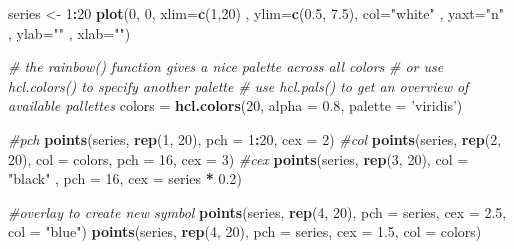 \documentclass[]{book}
\newenvironment{Shaded}{\begin{snugshade}}{\end{snugshade}}
\newcommand{\CommentTok}[1]{\textcolor[rgb]{0.56,0.35,0.01}{\textit{#1}}}
\newcommand{\DataTypeTok}[1]{\textcolor[rgb]{0.13,0.29,0.53}{#1}}
\newcommand{\DecValTok}[1]{\textcolor[rgb]{0.00,0.00,0.81}{#1}}
\newcommand{\FloatTok}[1]{\textcolor[rgb]{0.00,0.00,0.81}{#1}}
\newcommand{\KeywordTok}[1]{\textcolor[rgb]{0.13,0.29,0.53}{\textbf{#1}}}
\newcommand{\NormalTok}[1]{#1}
\newcommand{\OperatorTok}[1]{\textcolor[rgb]{0.81,0.36,0.00}{\textbf{#1}}}
\newcommand{\StringTok}[1]{\textcolor[rgb]{0.31,0.60,0.02}{#1}}
\begin{document}
\begin{Shaded}
\begin{Highlighting}[]
\NormalTok{series <-}\StringTok{ }\DecValTok{1}\OperatorTok{:}\DecValTok{20}
\KeywordTok{plot}\NormalTok{(}\DecValTok{0}\NormalTok{, }\DecValTok{0}\NormalTok{, }\DataTypeTok{xlim=}\KeywordTok{c}\NormalTok{(}\DecValTok{1}\NormalTok{,}\DecValTok{20}\NormalTok{) , }\DataTypeTok{ylim=}\KeywordTok{c}\NormalTok{(}\FloatTok{0.5}\NormalTok{, }\FloatTok{7.5}\NormalTok{), }\DataTypeTok{col=}\StringTok{"white"}\NormalTok{ , }\DataTypeTok{yaxt=}\StringTok{"n"}\NormalTok{ , }\DataTypeTok{ylab=}\StringTok{""}\NormalTok{ , }\DataTypeTok{xlab=}\StringTok{""}\NormalTok{)}

\CommentTok{# the rainbow() function gives a nice palette across all colors}
\CommentTok{# or use hcl.colors() to specify another palette}
\CommentTok{# use  hcl.pals() to get an overview of available pallettes}
\NormalTok{colors =}\StringTok{ }\KeywordTok{hcl.colors}\NormalTok{(}\DecValTok{20}\NormalTok{, }\DataTypeTok{alpha =} \FloatTok{0.8}\NormalTok{, }\DataTypeTok{palette =} \StringTok{'viridis'}\NormalTok{)}

\CommentTok{#pch}
\KeywordTok{points}\NormalTok{(series, }\KeywordTok{rep}\NormalTok{(}\DecValTok{1}\NormalTok{, }\DecValTok{20}\NormalTok{), }\DataTypeTok{pch =} \DecValTok{1}\OperatorTok{:}\DecValTok{20}\NormalTok{, }\DataTypeTok{cex =} \DecValTok{2}\NormalTok{)}
\CommentTok{#col}
\KeywordTok{points}\NormalTok{(series, }\KeywordTok{rep}\NormalTok{(}\DecValTok{2}\NormalTok{, }\DecValTok{20}\NormalTok{), }\DataTypeTok{col =}\NormalTok{ colors, }\DataTypeTok{pch =} \DecValTok{16}\NormalTok{, }\DataTypeTok{cex =} \DecValTok{3}\NormalTok{)}
\CommentTok{#cex}
\KeywordTok{points}\NormalTok{(series, }\KeywordTok{rep}\NormalTok{(}\DecValTok{3}\NormalTok{, }\DecValTok{20}\NormalTok{), }\DataTypeTok{col =} \StringTok{"black"}\NormalTok{ , }\DataTypeTok{pch =} \DecValTok{16}\NormalTok{, }\DataTypeTok{cex =}\NormalTok{ series }\OperatorTok{*}\StringTok{ }\FloatTok{0.2}\NormalTok{)}

\CommentTok{#overlay to create new symbol}
\KeywordTok{points}\NormalTok{(series, }\KeywordTok{rep}\NormalTok{(}\DecValTok{4}\NormalTok{, }\DecValTok{20}\NormalTok{), }\DataTypeTok{pch =}\NormalTok{ series, }\DataTypeTok{cex =} \FloatTok{2.5}\NormalTok{, }\DataTypeTok{col =} \StringTok{"blue"}\NormalTok{)}
\KeywordTok{points}\NormalTok{(series, }\KeywordTok{rep}\NormalTok{(}\DecValTok{4}\NormalTok{, }\DecValTok{20}\NormalTok{), }\DataTypeTok{pch =}\NormalTok{ series, }\DataTypeTok{cex =} \FloatTok{1.5}\NormalTok{, }\DataTypeTok{col =}\NormalTok{ colors)}
 

\end{Highlighting}
\end{Shaded}
\end{document}
